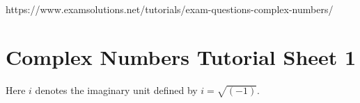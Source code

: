 https://www.examsolutions.net/tutorials/exam-questions-complex-numbers/




\section*{Complex Numbers Tutorial Sheet 1}
Here $i$ denotes the imaginary unit defined by $i = \sqrt{( -1 )}$. 














